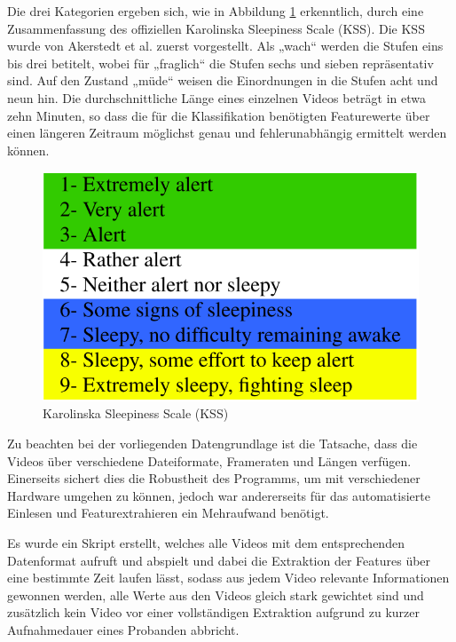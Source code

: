 Die drei Kategorien ergeben sich, wie in Abbildung \ref{fig:KSSScale} erkenntlich, durch eine Zusammenfassung des offiziellen Karolinska Sleepiness Scale (KSS). Die KSS wurde von Akerstedt et al. \cite{AK90} zuerst vorgestellt. Als „wach“ werden die Stufen eins bis drei betitelt, wobei für „fraglich“ die Stufen sechs und sieben repräsentativ sind. Auf den Zustand „müde“ weisen die Einordnungen in die Stufen acht und neun hin. Die durchschnittliche Länge eines einzelnen Videos beträgt in etwa zehn Minuten, so dass die für die Klassifikation benötigten Featurewerte über einen längeren Zeitraum möglichst genau und fehlerunabhängig ermittelt werden können. 

\begin{figure}
\centering
\includegraphics[scale=0.6]{images/KSSScale.png}
\caption{Karolinska Sleepiness Scale (KSS)}
\label{fig:KSSScale}
\end{figure}

Zu beachten bei der vorliegenden Datengrundlage ist die Tatsache, dass die Videos über verschiedene Dateiformate, Frameraten und Längen verfügen. Einerseits sichert dies die Robustheit des Programms, um mit verschiedener Hardware umgehen zu können, jedoch war andererseits für das automatisierte Einlesen und Featurextrahieren ein Mehraufwand benötigt. 

Es wurde ein Skript erstellt, welches alle Videos mit dem entsprechenden Datenformat aufruft und abspielt und dabei die Extraktion der Features über eine bestimmte Zeit laufen lässt, sodass aus jedem Video relevante Informationen gewonnen werden, alle Werte aus den Videos gleich stark gewichtet sind und zusätzlich kein Video vor einer vollständigen Extraktion aufgrund zu kurzer Aufnahmedauer eines Probanden abbricht.


